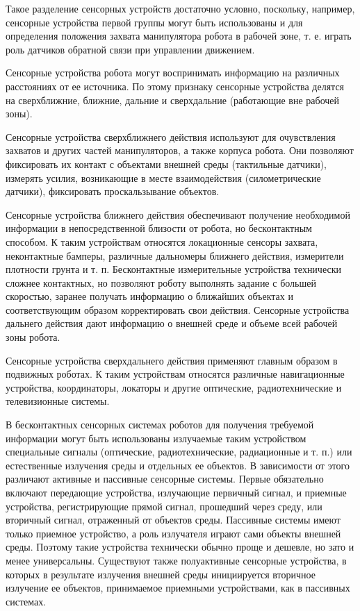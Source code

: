 Такое разделение сенсорных устройств достаточно условно, поскольку, например, сенсорные устройства первой группы могут быть использованы и для определения положения захвата манипулятора робота в рабочей зоне, т. е. играть роль датчиков обратной связи при управлении движением.

Сенсорные устройства робота могут воспринимать информацию на различных расстояниях от ее источника. По этому признаку сенсорные устройства делятся на сверхближние, ближние, дальние и сверхдальние (работающие вне рабочей зоны).

Сенсорные устройства сверхближнего действия используют для очувствления захватов и других частей манипуляторов, а также корпуса робота. Они позволяют фиксировать их контакт с объектами внешней среды (тактильные датчики), измерять усилия, возникающие в месте взаимодействия (силометрические датчики), фиксировать проскальзывание объектов.

Сенсорные устройства ближнего действия обеспечивают получение необходимой информации в непосредственной близости от робота, но бесконтактным способом. К таким устройствам относятся локационные сенсоры захвата, неконтактные бамперы, различные дальномеры ближнего действия, измерители плотности грунта и т. п. Бесконтактные измерительные устройства технически сложнее контактных, но позволяют роботу выполнять задание с большей скоростью, заранее получать информацию о ближайших объектах и соответствующим образом корректировать свои действия.
Сенсорные устройства дальнего действия дают информацию о внешней среде и объеме всей рабочей зоны робота.

Сенсорные устройства сверхдальнего действия применяют главным образом в подвижных роботах. К таким устройствам относятся различные навигационные устройства, координаторы, локаторы и другие оптические, радиотехнические и телевизионные системы.

В бесконтактных сенсорных системах роботов для получения требуемой информации могут быть использованы излучаемые таким устройством специальные сигналы (оптические, радиотехнические, радиационные и т. п.) или естественные излучения среды и отдельных ее объектов. В зависимости от этого различают активные и пассивные сенсорные системы. Первые обязательно включают передающие устройства, излучающие первичный сигнал, и приемные устройства, регистрирующие прямой сигнал, прошедший через среду, или вторичный сигнал, отраженный от объектов среды. Пассивные системы имеют только приемное устройство, а роль излучателя играют сами объекты внешней среды. Поэтому такие устройства технически обычно проще и дешевле, но зато и менее универсальны. Существуют также полуактивные сенсорные устройства, в которых в результате излучения внешней среды инициируется вторичное излучение ее объектов, принимаемое приемными устройствами, как в пассивных системах.
 
